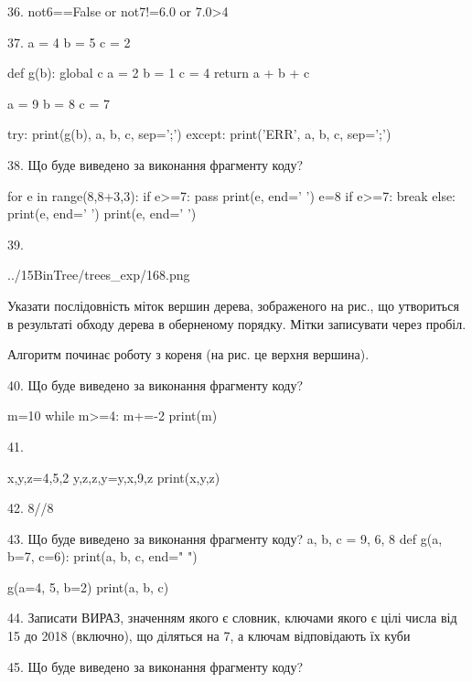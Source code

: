 \documentclass[11pt]{article}
\begin{document}
36. 
not6==False or not7!=6.0 or 7.0>4

37. 
a = 4
b = 5
c = 2

def g(b):
global c    a = 2
    b = 1
    c = 4
    return a + b + c

a = 9
b = 8
c = 7

try:
    print(g(b), a, b, c, sep=';')
except:
    print('ERR', a, b, c, sep=';')


38. Що буде виведено за виконання фрагменту коду?

for e in range(8,8+3,3):
    if e>=7:
        pass
    print(e, end=' ')
    e=8
    if e>=7:
        break
else:
    print(e, end=' ')
print(e, end=' ')


39. 

\begin{center}
	{../15BinTree/trees_exp/168.png}
\end{center}
Указати послідовність міток вершин дерева, зображеного на рис., що утвориться в результаті обходу дерева в оберненому порядку. Мітки записувати через пробіл.\par Алгоритм починає роботу з кореня (на рис. це верхня вершина).


40. Що буде виведено за виконання фрагменту коду?

m=10
while m>=4:
    m+=-2
print(m)



41. 

x,y,z=4,5,2
y,z,z,y=y,x,9,z
print(x,y,z)


42. 
8//8%

43. Що буде виведено за виконання фрагменту коду?
a, b, c = 9, 6, 8
def g(a, b=7, c=6):
    print(a, b, c, end=" ")

g(a=4, 5, b=2)
print(a, b, c)


44. 
Записати ВИРАЗ, значенням якого є словник, ключами якого є цілі числа від 15 до 2018 (включно), що діляться на 7, а ключам відповідають їх куби 

45. Що буде виведено за виконання фрагменту коду?
\end{document}
